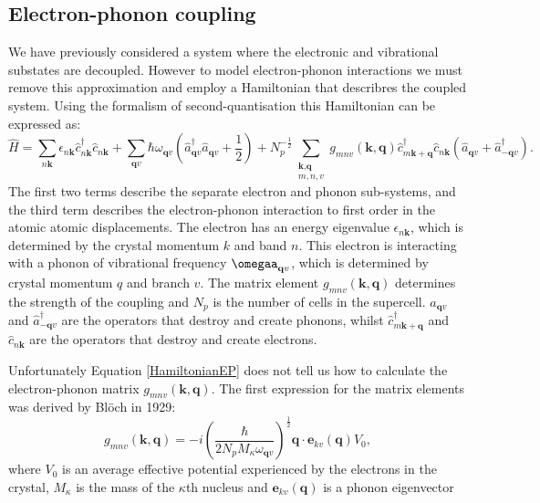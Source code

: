 \subsection{Electron-phonon coupling}
We have previously considered a system where the electronic and vibrational substates are decoupled. %
However to model electron-phonon interactions we must remove this approximation and employ a Hamiltonian that describres the coupled system. Using the formalism of second-quantisation this Hamiltonian can be expressed as:\autocite{Giustino2017}
\begin{equation} \label{HamiltonianEP}
    \hat{H} = \sum_{n\textbf{k}}\epsilon_{n\textbf{k}}\hat{c}^{\dagger}_{n\textbf{k}}\hat{c}_{n\textbf{k}} + \sum_{\textbf{q}v}\hbar\omega_{\textbf{q}v}(\hat{a}^{\dagger}_{\textbf{q}v}\hat{a}_{\textbf{q}v}+\frac{1}{2})+N_p^{-\frac{1}{2}}\sum_{\substack{\textbf{k},\textbf{q} \\ m,n,v}}g_{mnv}(\textbf{k},\textbf{q})\hat{c}^{\dagger}_{m\textbf{k}+\textbf{q}}\hat{c}_{n\textbf{k}}(\hat{a}_{\textbf{q}v}+\hat{a}^{\dagger}_{-\textbf{q}v}).
\end{equation}
The first two terms describe the separate electron and phonon sub-systems, and the third term describes the electron-phonon interaction to first order in the atomic atomic displacements. The electron has an energy eigenvalue $\epsilon_{n\textbf{k}}$, which is determined by the crystal momentum $k$ and band $n$. This electron is interacting with a phonon of vibrational frequency $\omegaa_{\textbf{q}v}$, which is determined by crystal momentum $q$ and branch $v$. The matrix element $g_{mnv}(\textbf{k},\textbf{q})$ determines the strength of the coupling and $N_p$ is the number of cells in the supercell. $\hat{a}_{\textbf{q}v}$ and $\hat{a}^{\dagger}_{-\textbf{q}v}$ are the operators that destroy and create phonons, whilst $\hat{c}^{\dagger}_{m\textbf{k}+\textbf{q}}$ and $\hat{c}_{n\textbf{k}}$ are the operators that destroy and create electrons.

Unfortunately Equation \ref{HamiltonianEP} does not tell us how to calculate the electron-phonon matrix $g_{mnv}(\textbf{k},\textbf{q})$. The first expression for the matrix elements was derived by Bl\"{o}ch in 1929:\autocite{Giustino2017}
\begin{equation}
g_{mnv}(\textbf{k},\textbf{q}) = -i\left(\frac{\hbar}{2N_pM_\kappa\omega_{\textbf{q}v}}\right)^{\frac{1}{2}}\textbf{q}\cdot\textbf{e}_{kv}(\textbf{q})V_0,
\end{equation}
where $V_0$ is an average effective potential experienced by the electrons in the crystal, $M_\kappa$ is the mass of the $\kappa$th nucleus and $\textbf{e}_{kv}(\textbf{q})$ is a phonon eigenvector

